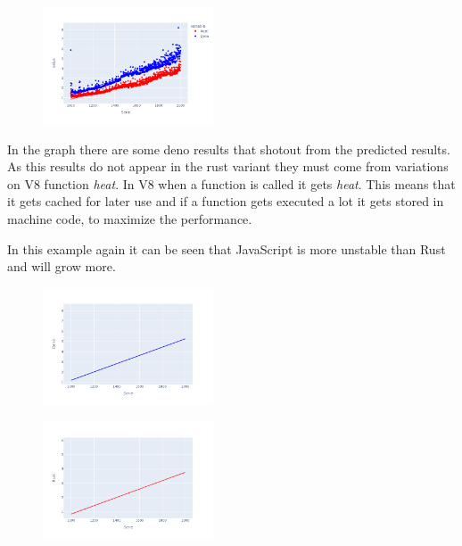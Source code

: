 \documentclass[12pt, letterpaper]{article}
\begin{document}
\begin{multicols}{2}
    \begin{figure}[H]
        \centering
        \includegraphics[width=0.45\textwidth]{images/secretbox_lines}
    \end{figure}

    In the graph there are some deno results that shotout from the predicted results. As this results do not appear in the rust variant they must come from variations on V8 function \textit{heat}. In V8 when a function is called it gets \textit{heat}. This means that it gets cached for later use and if a function gets executed a lot it gets stored in machine code, to maximize the performance.

    In this example again it can be seen that JavaScript is more unstable than Rust and will grow more.

    \begin{figure}[H]
        \centering
        \includegraphics[width=0.45\textwidth]{trend_secretbox_deno}
    \end{figure}

    \begin{figure}[H]
        \centering
        \includegraphics[width=0.45\textwidth]{images/trend_secretbox_rust}
    \end{figure}


\end{multicols}
\end{document}
